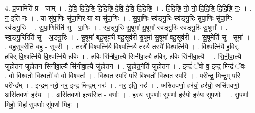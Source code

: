 \documentclass[17pt]{extarticle}
\begin{document}
4. प्र॒जामिति॑ प्र - जाम् । . दे॒वि॒ दि॒दि॒ड्ढि॒ दि॒दि॒ड्ढि॒ दे॒वि॒ दे॒वि॒ दि॒दि॒ड्ढि॒ । . दि॒दि॒ड्ढि॒ नो॒ नो॒ दि॒दि॒ड्ढि॒ दि॒दि॒ड्ढि॒ नः॒ । . न॒ इति॑ नः । . या सु॑पा॒णिः सु॑पा॒णिर् या या सु॑पा॒णिः । . सु॒पा॒णिः स्व॑ङ्गु॒रिः स्व॑ङ्गु॒रिः सु॑पा॒णिः सु॑पा॒णिः स्व॑ङ्गु॒रिः । . सु॒पा॒णिरिति॑ सु - पा॒णिः । . स्व॒ङ्गु॒रिः सु॒षूमा॑ सु॒षूमा᳚ स्वङ्गु॒रिः स्व॑ङ्गु॒रिः सु॒षूमा᳚ । . स्व॒ङ्गु॒रिरिति॑ सु - अ॒ङ्गु॒रिः । . सु॒षूमा॑ बहु॒सूव॑री बहु॒सूव॑री सु॒षूमा॑ सु॒षूमा॑ बहु॒सूव॑री । . सु॒षूमेति॑ सु - सूमा᳚ । . ब॒हु॒सूव॒रीति॑ बहु - सूव॑री । . तस्यै॑ वि॒श्पत्नि॑यै वि॒श्पत्नि॑यै॒ तस्यै॒ तस्यै॑ वि॒श्पत्नि॑यै । . वि॒श्पत्नि॑यै ह॒विर्. ह॒विर् वि॒श्पत्नि॑यै वि॒श्पत्नि॑यै ह॒विः । . ह॒विः सि॑नीवा॒ल्यै सि॑नीवा॒ल्यै ह॒विर्. ह॒विः सि॑नीवा॒ल्यै । . सि॒नी॒वा॒ल्यै जु॑होतन जुहोतन सिनीवा॒ल्यै सि॑नीवा॒ल्यै जु॑होतन । . जु॒हो॒त॒नेति॑ जुहोतन । . इन्द्रं॑ ॅवो व॒ इन्द्र॒ मिन्द्रं॑ ॅवः । . वो॒ वि॒श्वतो॑ वि॒श्वतो॑ वो वो वि॒श्वतः॑ । . वि॒श्वत॒ स्परि॒ परि॑ वि॒श्वतो॑ वि॒श्वत॒ स्परि॑ । . परीन्द्र॒ मिन्द्र॒म् परि॒ परीन्द्र᳚म् । . इन्द्र॒म् नरो॒ नर॒ इन्द्र॒ मिन्द्र॒म् नरः॑ । . नर॒ इति॒ नरः॑ । . असि॑तवर्णा॒ हर॑यो॒ हर॑यो॒ असि॑तवर्णा॒ असि॑तवर्णा॒ हर॑यः । . असि॑तवर्णा॒ इत्यसि॑त - व॒र्णाः॒ । . हर॑यः सुप॒र्णाः सु॑प॒र्णा हर॑यो॒ हर॑यः सुप॒र्णाः । . सु॒प॒र्णा मिहो॒ मिहः॑ सुप॒र्णाः सु॑प॒र्णा मिहः॑ । \newline
\end{document}
